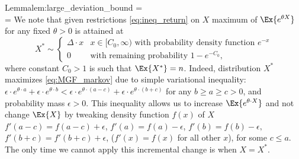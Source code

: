 \begin{prevproof}{Lemma}{lem:large_deviation_bound}
	\be
	=\le{} \\
	=
	\label{eq:MGF_markov}
	\ee
	We note that given restrictions \eqref{eq:ineq_return} on $X$ maximum of $\Ex{e^{\theta X}}$ for any fixed $\theta>0$ is attained at 
	\[
	X^*\sim
	\begin{cases}
	\Delta\cdot x  & x\in[C_0,\infty) \text{ with probability density function } e^{-x}\\
	0 & \text{with remaining probability }1-e^{-C_0},
	\end{cases}
	\]
	where constant $C_0>1$ is such that $\Ex{X^*}=n$. Indeed, distribution $X^*$ maximizes \eqref{eq:MGF_markov} due to simple variational inequality:
	$\epsilon\cdot e^{\theta\cdot a}+\epsilon\cdot e^{\theta\cdot b}<\epsilon\cdot e^{\theta\cdot (a-c)}+\epsilon\cdot e^{\theta\cdot (b+c)}$ for any $b \ge a \ge c > 0$, and probability mass $\epsilon>0$.
	This inequality allows us to increase $\Ex{e^{\theta\cdot X}}$ and not change $\Ex{X}$ by tweaking density function $f(x)$ of $X$ 
	$f'(a-c)=f(a-c)+\epsilon$, $f'(a)=f(a)-\epsilon$, $f'(b)=f(b)-\epsilon,$ $f'(b+c)=f'(b+c)+\epsilon$, ($f'(x)=f(x)$ for all other $x$), for some $c\le a$. 
	The only time we cannot apply this incremental change is when $X=X^*$.
	

\end{prevproof}
